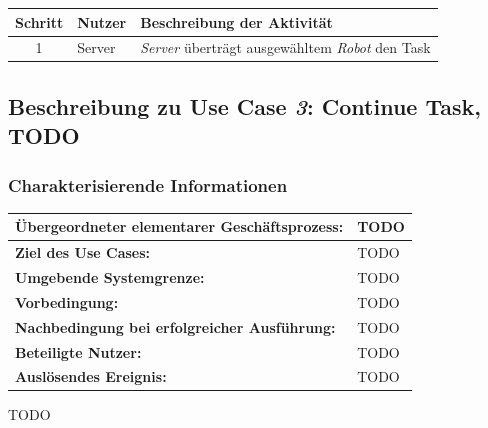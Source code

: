 		\begin{table}[H]
			\centering
			\begin{tabularx}{\textwidth}{|c|p{2cm}|X|}
				\hline
				Schritt & Nutzer & Beschreibung der Aktivität \\ \hline
				1 & Server & \emph{Server} überträgt ausgewähltem \emph{Robot} den Task \\
				\hline
			\end{tabularx}
		\end{table}
		
		
		\pagebreak
		
		
		\subsection{Beschreibung zu Use Case \emph{3}: Continue Task, TODO}
		
		\subsubsection*{Charakterisierende Informationen}
		
		\begin{table}[H]
			\centering
			\begin{tabularx}{\textwidth}{|p{5cm}|X|}
				\hline
				\textbf{Übergeordneter elementarer Geschäftsprozess:} & TODO  \\ \hline
				\textbf{Ziel des Use Cases:} & TODO \\ \hline
				\textbf{Umgebende Systemgrenze:} & TODO \\ \hline
				\textbf{Vorbedingung:} & TODO \\ \hline
				\textbf{Nachbedingung bei erfolgreicher Ausführung:} & TODO \\ \hline
				\textbf{Beteiligte Nutzer:} & TODO \\ \hline
				\textbf{Auslösendes Ereignis:} & TODO \\
				\hline
			\end{tabularx}
		\end{table}
		
		TODO
		
		
